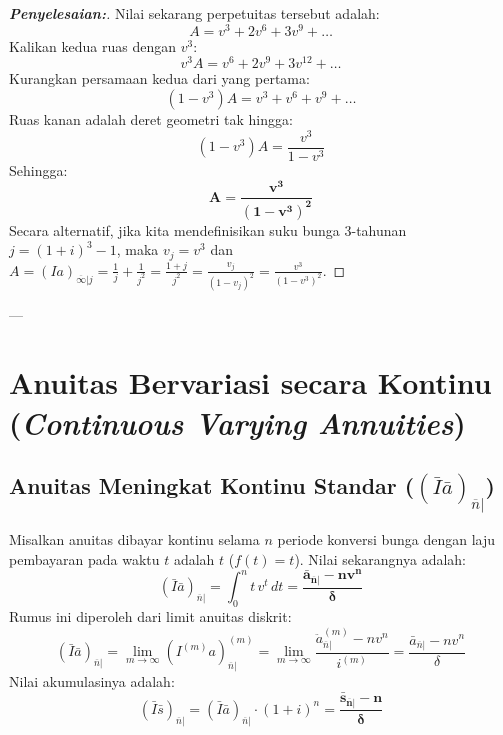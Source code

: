 \documentclass[11pt,a4paper]{article}
\begin{document}
\begin{proof}[\textbf{Penyelesaian:}]
Nilai sekarang perpetuitas tersebut adalah:
\begin{equation*}
    A = v^3 + 2 v^6 + 3 v^9 + \dots
\end{equation*}
Kalikan kedua ruas dengan $v^3$:
\begin{equation*}
    v^3 A = v^6 + 2 v^9 + 3 v^{12} + \dots
\end{equation*}
Kurangkan persamaan kedua dari yang pertama:
\begin{equation*}
    (1 - v^3) A = v^3 + v^6 + v^9 + \dots
\end{equation*}
Ruas kanan adalah deret geometri tak hingga:
\begin{equation*}
    (1 - v^3) A = \frac{v^3}{1 - v^3}
\end{equation*}
Sehingga:
\begin{equation*}
    \mathbf{A = \frac{v^3}{(1 - v^3)^2}}
\end{equation*}
Secara alternatif, jika kita mendefinisikan suku bunga 3-tahunan $j = (1+i)^3 - 1$, maka $v_j = v^3$ dan $A = (Ia)_{\overline{\infty}|j} = \frac{1}{j} + \frac{1}{j^2} = \frac{1+j}{j^2} = \frac{v_j}{(1 - v_j)^2} = \frac{v^3}{(1 - v^3)^2}$.
\end{proof}

---

\section{Anuitas Bervariasi secara Kontinu (\textit{Continuous Varying Annuities})}

\subsection{Anuitas Meningkat Kontinu Standar (\texorpdfstring{$(\bar{I}\bar{a})_{\overline{n}|}$}{(I_bar a_bar)_n})}

Misalkan anuitas dibayar kontinu selama $n$ periode konversi bunga dengan laju pembayaran pada waktu $t$ adalah $t$ ($f(t) = t$).
Nilai sekarangnya adalah:
\begin{equation}
    (\bar{I}\bar{a})_{\overline{n}|} = \int_0^n t \, v^t \, dt = \mathbf{\frac{\bar{a}_{\overline{n}|} - n v^n}{\delta}}
\end{equation}
Rumus ini diperoleh dari limit anuitas diskrit:
\begin{equation}
    (\bar{I}\bar{a})_{\overline{n}|} = \lim_{m \to \infty} (I^{(m)} a)_{\overline{n}|}^{(m)} = \lim_{m \to \infty} \frac{\ddot{a}_{\overline{n}|}^{(m)} - n v^n}{i^{(m)}} = \frac{\bar{a}_{\overline{n}|} - n v^n}{\delta}
\end{equation}
Nilai akumulasinya adalah:
\begin{equation}
    (\bar{I}\bar{s})_{\overline{n}|} = (\bar{I}\bar{a})_{\overline{n}|} \cdot (1+i)^n = \mathbf{\frac{\bar{s}_{\overline{n}|} - n}{\delta}}
\end{equation}
\end{document}
